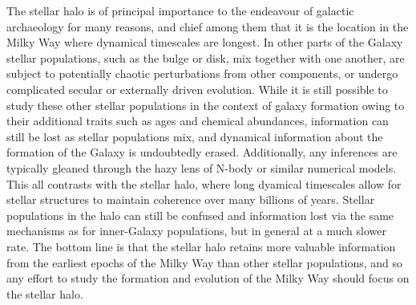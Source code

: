 The stellar halo is of principal importance to the endeavour of galactic archaeology for many reasons, and chief among them that it is the location in the Milky Way where dynamical timescales are longest. In other parts of the Galaxy stellar populations, such as the bulge or disk, mix together with one another, are subject to potentially chaotic perturbations from other components, or undergo complicated secular or externally driven evolution. While it is still possible to study these other stellar populations in the context of galaxy formation owing to their additional traits such as ages and chemical abundances, information can still be lost as stellar populations mix, and dynamical information about the formation of the Galaxy is undoubtedly erased. Additionally, any inferences are typically gleaned through the hazy lens of N-body or similar numerical models. This all contrasts with the stellar halo, where long dyamical timescales allow for stellar structures to maintain coherence over many billions of years. Stellar populations in the halo can still be confused and information lost via the same mechanisms as for inner-Galaxy populations, but in general at a much slower rate. The bottom line is that the stellar halo retains more valuable information from the earliest epochs of the Milky Way than other stellar populations, and so any effort to study the formation and evolution of the Milky Way should focus on the stellar halo.

